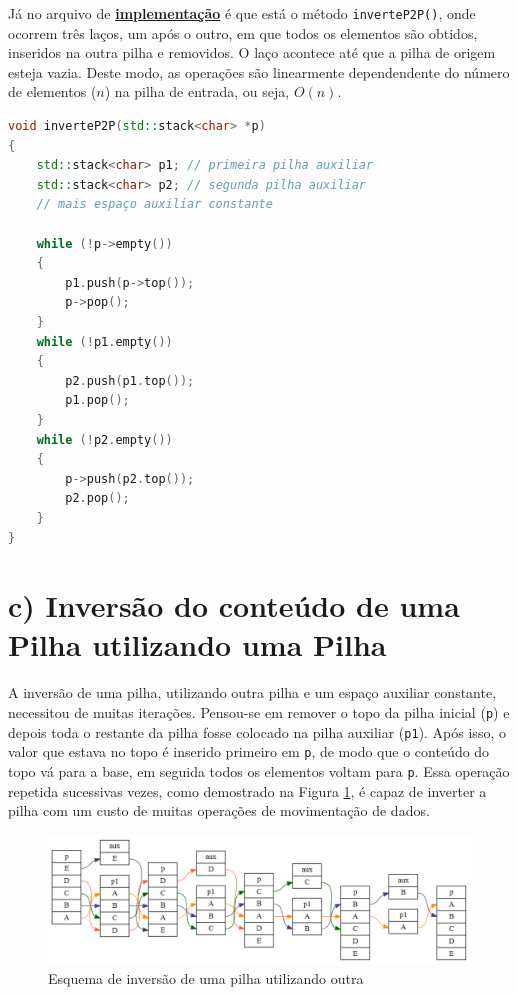 \documentclass[
  brazilian,
  paper=a4,
  oneside  ,captions=tableheading
]{scrbook}
\newcommand{\passthrough}[1]{#1}
\begin{document}
Já no arquivo de
\href{https://github.com/ecostadelle/lista_pilhas_filas/blob/main/include/inverteP2P.cpp}{\textbf{implementação}}
é que está o método \passthrough{\lstinline!inverteP2P()!}, onde ocorrem
três laços, um após o outro, em que todos os elementos são obtidos,
inseridos na outra pilha e removidos. O laço acontece até que a pilha de
origem esteja vazia. Deste modo, as operações são linearmente
dependendente do número de elementos (\(n\)) na pilha de entrada, ou
seja, \(O(n)\).

\begin{lstlisting}[language={C++}]
void inverteP2P(std::stack<char> *p)
{
    std::stack<char> p1; // primeira pilha auxiliar
    std::stack<char> p2; // segunda pilha auxiliar
    // mais espaço auxiliar constante

    while (!p->empty())
    {
        p1.push(p->top());
        p->pop();
    }
    while (!p1.empty())
    {
        p2.push(p1.top());
        p1.pop();
    }
    while (!p2.empty())
    {
        p->push(p2.top());
        p2.pop();
    }
}
\end{lstlisting}

\hypertarget{c-inversuxe3o-do-conteuxfado-de-uma-pilha-utilizando-uma-pilha}{%
\section{c) Inversão do conteúdo de uma Pilha utilizando uma
Pilha}\label{c-inversuxe3o-do-conteuxfado-de-uma-pilha-utilizando-uma-pilha}}

A inversão de uma pilha, utilizando outra pilha e um espaço auxiliar
constante, necessitou de muitas iterações. Pensou-se em remover o topo
da pilha inicial (\passthrough{\lstinline!p!}) e depois toda o restante
da pilha fosse colocado na pilha auxiliar
(\passthrough{\lstinline!p1!}). Após isso, o valor que estava no topo é
inserido primeiro em \passthrough{\lstinline!p!}, de modo que o conteúdo
do topo vá para a base, em seguida todos os elementos voltam para
\passthrough{\lstinline!p!}. Essa operação repetida sucessivas vezes,
como demostrado na Figura \ref{Fig:1}, é capaz de inverter a pilha com
um custo de muitas operações de movimentação de dados.

\begin{figure}
\hypertarget{Fig:1}{%
\centering
\includegraphics{inverteP1P.png}
\caption{Esquema de inversão de uma pilha utilizando outra}\label{Fig:1}
}
\end{figure}
\end{document}
